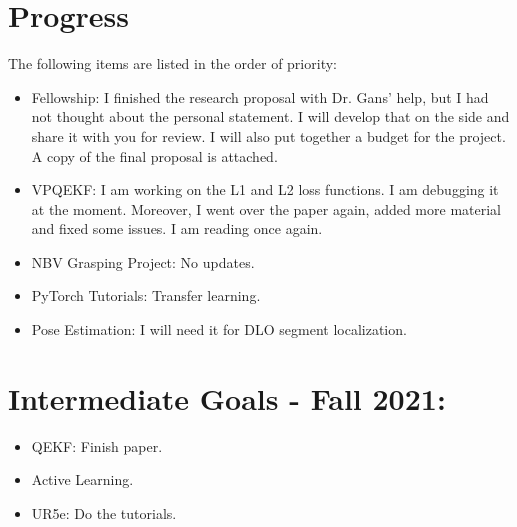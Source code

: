 \documentclass[11pt]{article}
\begin{document}
\section{Progress}
The following items are listed in the order of priority:
\begin{itemize}
      \item Fellowship: I finished the research proposal with Dr. Gans' help, but
      I had not thought about the personal statement. I will develop that on the
      side and share it with you for review. I will also put together a budget
      for the project. A copy of the final proposal is attached.
      \item VPQEKF: I am working on the L1 and L2 loss functions. I am debugging it
      at the moment. Moreover, I went over the paper again, added more
      material and fixed some issues. I am reading \cite{zinsser2006writing} once
      again.
      \item NBV Grasping Project: No updates.
      \item PyTorch Tutorials: Transfer learning.
      \item Pose Estimation: I will need it for DLO segment localization.
\end{itemize}


\section{Intermediate Goals - Fall 2021:}
\begin{itemize}
      \item QEKF: Finish paper.
      \item Active Learning.
      \item UR5e: Do the tutorials.
\end{itemize}


\newpage


\end{document}
